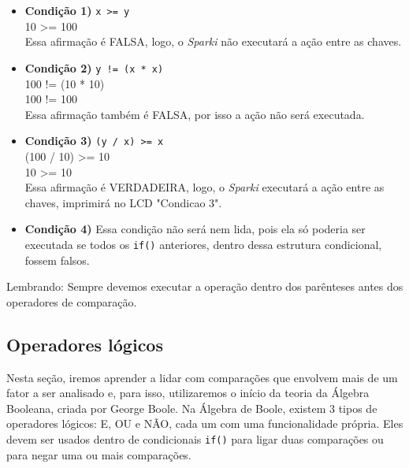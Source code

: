 \documentclass[conference]{IEEEtran}
\begin{document}
\begin{itemize}
    \item \textbf{Condição 1)} \texttt{x >= y} \\
    10 >= 100 \\
    Essa afirmação é FALSA, logo, o \textit{Sparki} não executará a ação entre as chaves.
    
    \item \textbf{Condição 2)} \texttt{y != (x * x)} \\
    100 != (10 * 10) \\
    100 != 100 \\
    Essa afirmação também é FALSA, por isso a ação não será executada.
    
    \item \textbf{Condição 3)} \texttt{(y / x) >= x} \\
    (100 / 10) >= 10 \\
    10 >= 10 \\
    Essa afirmação é VERDADEIRA, logo, o \textit{Sparki} executará a ação entre as chaves, imprimirá no LCD "Condicao 3".
    
    \item \textbf{Condição 4)} Essa condição não será nem lida, pois ela só poderia ser executada se todos os \texttt{if()} anteriores, dentro dessa estrutura condicional, fossem falsos.
\end{itemize}

\par
Lembrando: Sempre devemos executar a operação dentro dos parênteses antes dos operadores de comparação.

\begin{center}
    \subsection{Operadores lógicos}
\end{center}
\par
Nesta seção, iremos aprender a lidar com comparações que envolvem mais de um fator a ser analisado e, para isso, utilizaremos o início da teoria da Álgebra Booleana, criada por George Boole. Na Álgebra de Boole, existem 3 tipos de operadores lógicos: E, OU e NÃO, cada um com uma funcionalidade própria. Eles devem ser usados dentro de condicionais \texttt{if()} para ligar duas comparações ou para negar uma ou mais comparações.
\end{document}
